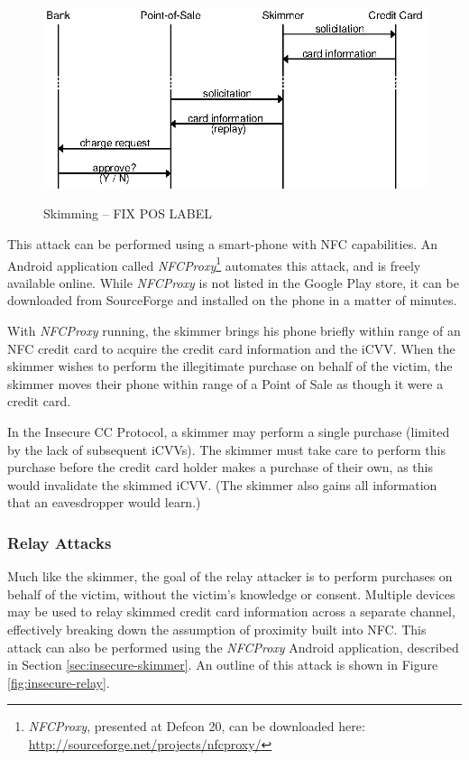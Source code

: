 \begin{figure}
  \caption{Skimming -- FIX POS LABEL}
  \centering
    \includegraphics{img/attack-3-skim.eps}
  \label{fig:insecure-skimmer}
\end{figure}

This attack can be performed using a smart-phone with NFC capabilities.
An Android application called \emph{NFCProxy}\footnote{\emph{NFCProxy}\cite{NFCProxy}, presented at Defcon 20, can be downloaded here: \url{http://sourceforge.net/projects/nfcproxy/}} automates this attack, and is freely available online.
While \emph{NFCProxy} is not listed in the Google Play store, it can be downloaded from SourceForge and installed on the phone in a matter of minutes.

With \emph{NFCProxy} running, the skimmer brings his phone briefly within range of an NFC credit card to acquire the credit card information and  the iCVV.
When the skimmer wishes to perform the illegitimate purchase on behalf of the victim, the skimmer moves their phone within range of a Point of Sale as though it were a credit card.

In the Insecure CC Protocol, a skimmer may perform a single purchase (limited by the lack of subsequent iCVVs).
The skimmer must take care to perform this purchase before the credit card holder makes a purchase of their own, as this would invalidate the skimmed iCVV.
(The skimmer also gains all information that an eavesdropper would learn.)






\subsubsection{Relay Attacks}
\label{sec:insecure-relay}

Much like the skimmer, the goal of the relay attacker is to perform purchases on behalf of the victim, without the victim's knowledge or consent.
Multiple devices may be used to relay skimmed credit card information across a separate channel, effectively breaking down the assumption of proximity built into NFC.
This attack can also be performed using the \emph{NFCProxy} Android application, described in Section \ref{sec:insecure-skimmer}.
An outline of this attack is shown in Figure \ref{fig:insecure-relay}.

